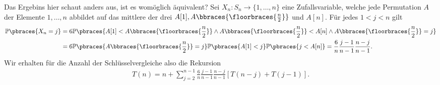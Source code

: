 \begin{solution}
	Das Ergebins hier schaut anders aus, ist es womöglich äquivalent? Sei $X_n: S_n \to \{1, \dots, n\}$ eine Zufallsvariable, welche jede Permutation $A$ der Elemente $1, \dots, n$ abbildet auf das mittlere der drei $A[1], A\bbraces{\floorbraces{\frac{n}{2}}}$ und $A[n]$. Für jedes $1 < j < n$ gilt
	\begin{align*}
		\mathbb{P}\pbraces{X_n = j} &= 6 \mathbb{P}\pbraces{A[1] < A\bbraces{\floorbraces{\frac{n}{2}}} \land A\bbraces{\floorbraces{\frac{n}{2}}} < A[n] \land A\bbraces{\floorbraces{\frac{n}{2}}} = j} \\
		&= 6 \mathbb{P}\pbraces{A\bbraces{\floorbraces{\frac{n}{2}}} = j} \mathbb{P}\pbraces{A[1] < j} \mathbb{P}\pbraces{j < A[n]} = \frac{6}{n}\frac{j - 1}{n - 1}\frac{n - j}{n - 1}. 
	\end{align*}
	Wir erhalten für die Anzahl der Schlüsselvergleiche also die Rekursion
	\begin{align*}
		T(n) = n + \sum_{j=2}^{n-1} \frac{6}{n}\frac{j - 1}{n - 1}\frac{n - j}{n - 1} 
		[T(n-j) + T(j - 1)].
	\end{align*}
\end{solution}
